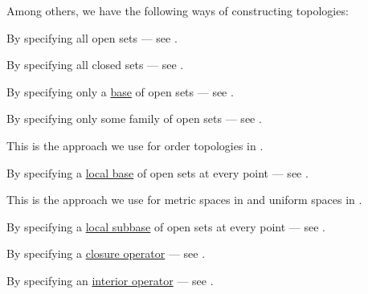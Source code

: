 \begin{remark}\label{rem:constructing_topologies}
  Among others, we have the following ways of constructing topologies:
  \begin{thmenum}
     By specifying all open sets --- see .

     By specifying all closed sets --- see .

     By specifying only a \hyperref[def:topological_base]{base} of open sets --- see .

     By specifying only some family of open sets --- see .

    This is the approach we use for order topologies in .

     By specifying a \hyperref[def:topological_local_base]{local base} of open sets at every point --- see .

    This is the approach we use for metric spaces in  and uniform spaces in .

     By specifying a \hyperref[def:topological_local_subbase]{local subbase} of open sets at every point --- see .

     By specifying a \hyperref[def:topological_closure_operator]{closure operator} --- see .

     By specifying an \hyperref[def:topological_interior_operator]{interior operator} --- see .
  \end{thmenum}
\end{remark}

